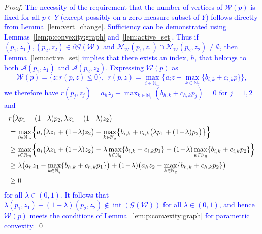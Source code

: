 \documentclass[smallextended]{svjour3}       %
\numberwithin{equation}{section}
\DeclareMathOperator{\interior}{int}
\DeclareMathOperator{\vertices}{vert}
\newcommand{\revision}[1]{\textcolor{blue}{#1}}
\begin{document}
\begin{proof}
\revision{
The necessity of the requirement that the number of vertices of $\mathcal W(p)$ is fixed 
for all $p\in Y$ (except possibly on a zero measure subset of $Y$) follows directly from Lemma~\ref{lem:vert_change}. Sufficiency can be demonstrated using Lemmas~\ref{lem:p:convexity:graph} and~\ref{lem:active_set}. Thus if $(p_1,z_1),(p_2,z_2)\in\partial \mathscr G(\mathcal W)$ and $\mathcal N_{\mathcal W}(p_1,z_1) \cap \mathcal N_{\mathcal W} (p_2, z_2) \neq \emptyset$, then Lemma~\ref{lem:active_set} implies that there exists an index, $h$, that belongs to both $\mathcal A(p_1,z_1)$ and $\mathcal A(p_2,z_2)$. Expressing $\mathcal W(p)$ as  
\[
\mathcal W(p) = \{ z : r(p,z) \leq 0\}, \ \ 
r(p,z) = \max_{i\in\mathbb N_m} \bigl\{ a_i z - \max_{k\in\mathbb N_q} \{ b_{i,k} + c_{i,k} p \} \bigr\},
\]
we therefore have $r(p_j,z_j) = a_h z_j - \max_{k\in\mathbb N_q} (b_{h,k} + c_{h,k} p_j ) = 0$ for $j = 1,2$ and
\begin{align*}
&r\bigl(\lambda p_1 + (1\!-\!\lambda) p_2, \lambda z_1 + (1\!-\!\lambda) z_2\bigr) \\
&= 
\max_{i\in\mathbb N_m} \Bigl\{ a_i \bigl(\lambda z_1 + (1\!-\!\lambda) z_2\bigr) - \max_{k\in\mathbb N_q} \bigl\{ b_{i,k} + c_{i,k}\bigl(\lambda p_1 + (1\!-\!\lambda) p_2\bigr) \bigr\} \Bigr\} \\
&\geq
\max_{i\in\mathbb N_m} \Bigl\{  a_i \bigl(\lambda z_1 + (1\!-\!\lambda) z_2\bigr)
- \lambda \max_{k\in\mathbb N_q} \{ b_{i,k} + c_{i,k} p_1\} 
- (1\!-\!\lambda) \max_{k\in\mathbb N_q} \{ b_{i,k} + c_{i,k} p_2\} \Bigr\} \\
&\geq
\lambda \bigl ( a_h z_1 - \max_{k\in\mathbb N_q} \{ b_{h,k} + c_{h,k} p_1\} \bigr) + (1\!-\!\lambda) \bigl( a_h z_2 - \max_{k\in\mathbb N_q} \{ b_{h,k} + c_{h,k} p_2\} \bigr) \\
&\geq 0
\end{align*}
for all $\lambda\in (0,1)$. It follows that $\lambda(p_1,z_1)+(1-\lambda) (p_2,z_2) \notin \interior (\mathscr G(\mathcal W))$ for all $\lambda\in (0,1)$, and hence $\mathcal W(p)$ meets the conditions of Lemma~\ref{lem:p:convexity:graph} for parametric convexity.}
\qed
\end{proof}
\end{document}
